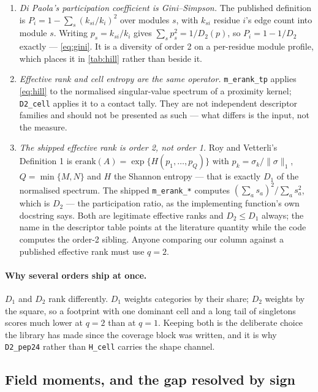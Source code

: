 \documentclass[11pt,a4paper]{article}
\newcommand{\dsc}[1]{\texttt{#1}}
\begin{document}
\begin{enumerate}
\item \emph{Di Paola's participation coefficient is Gini--Simpson.} The published definition
  \cite{DiPaola2015} is $P_i = 1 - \sum_s (k_{si}/k_i)^2$ over modules $s$, with $k_{si}$ residue
  $i$'s edge count into module $s$. Writing $p_s = k_{si}/k_i$ gives $\sum_s p_s^2 = 1/D_2(p)$, so
  $P_i = 1 - 1/D_2$ exactly --- \cref{eq:gini}. It is a diversity of order 2 on a per-residue
  module profile, which places it in \cref{tab:hill} rather than beside it.
\item \emph{Effective rank and cell entropy are the same operator.} \dsc{m\_erank\_tp} applies
  \cref{eq:hill} to the normalised singular-value spectrum of a proximity kernel;
  \dsc{D2\_cell} applies it to a contact tally. They are not independent descriptor families and
  should not be presented as such --- what differs is the input, not the measure.
\item \emph{The shipped effective rank is order 2, not order 1.} Roy and Vetterli's Definition 1
  \cite{RoyVetterli2007} is $\mathrm{erank}(A) = \exp\{H(p_1,\dots,p_Q)\}$ with
  $p_k = \sigma_k / \|\sigma\|_1$, $Q = \min\{M,N\}$ and $H$ the Shannon entropy --- that is
  exactly $D_1$ of the normalised spectrum.
  The shipped \dsc{m\_erank\_*} computes $(\sum_a s_a)^2 / \sum_a s_a^2$, which is $D_2$ --- the
  participation ratio, as the implementing function's own docstring says. Both are legitimate
  effective ranks and $D_2 \le D_1$ always; the name in the descriptor table points at the
  literature quantity while the code computes the order-2 sibling. Anyone comparing our column
  against a published effective rank must use $q = 2$.
\end{enumerate}

\paragraph{Why several orders ship at once.} $D_1$ and $D_2$ rank differently. $D_1$ weights
categories by their share; $D_2$ weights by the square, so a footprint with one dominant cell and a
long tail of singletons scores much lower at $q=2$ than at $q=1$. Keeping both is the deliberate
choice the library has made since the coverage block was written, and it is why \dsc{D2\_pep24}
rather than \dsc{H\_cell} carries the shape channel.

\subsection{Field moments, and the gap resolved by sign}
\label{sec:moments}
\end{document}
